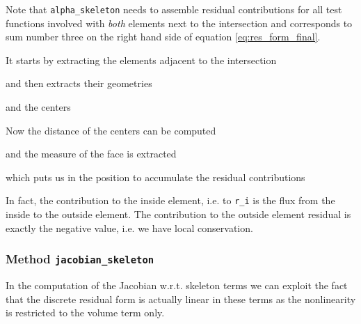 \documentclass[a4paper,12pt]{article}
\begin{document}
Note that \lstinline{alpha_skeleton} needs to assemble
residual contributions for all test functions involved with \textit{both}
elements next to the intersection and corresponds
to sum number three on the right hand side of equation \eqref{eq:res_form_final}.

It starts by extracting the elements adjacent to the intersection

and then extracts their geometries

and the centers

Now the distance of the centers can be computed

and the measure of the face is extracted

which puts us in the position to accumulate the residual contributions

In fact, the contribution to the inside element, i.e. to \lstinline{r_i} is the flux from the
inside to the outside element. The contribution to the outside
element residual is exactly the negative value, i.e. we have local conservation.

\subsubsection*{Method \lstinline{jacobian_skeleton}}

In the computation of the Jacobian w.r.t. skeleton terms
we can exploit the fact that the discrete residual form is
actually linear in these terms as the nonlinearity is restricted to the
volume term only.
\end{document}
